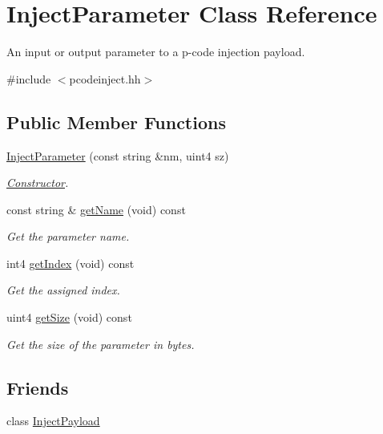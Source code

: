 \hypertarget{class_inject_parameter}{}\section{Inject\+Parameter Class Reference}
\label{class_inject_parameter}


An input or output parameter to a p-\/code injection payload.  




{\ttfamily \#include $<$pcodeinject.\+hh$>$}

\subsection*{Public Member Functions}
\begin{DoxyCompactItemize}
\item 
\mbox{\hyperlink{class_inject_parameter_a91de84dd9eafd1de37dfc56c7f526d8f}{Inject\+Parameter}} (const string \&nm, uint4 sz)
\begin{DoxyCompactList}\small\item\em \mbox{\hyperlink{class_constructor}{Constructor}}. \end{DoxyCompactList}\item 
const string \& \mbox{\hyperlink{class_inject_parameter_ae832644b1c2569f8bc0e65bc9927a23c}{get\+Name}} (void) const
\begin{DoxyCompactList}\small\item\em Get the parameter name. \end{DoxyCompactList}\item 
int4 \mbox{\hyperlink{class_inject_parameter_a8bf408340c63bc2d301f44edf7cfa881}{get\+Index}} (void) const
\begin{DoxyCompactList}\small\item\em Get the assigned index. \end{DoxyCompactList}\item 
uint4 \mbox{\hyperlink{class_inject_parameter_a0b0bd7385977774d8069fe3320c4a1b5}{get\+Size}} (void) const
\begin{DoxyCompactList}\small\item\em Get the size of the parameter in bytes. \end{DoxyCompactList}\end{DoxyCompactItemize}
\subsection*{Friends}
\begin{DoxyCompactItemize}
\item 
class \mbox{\hyperlink{class_inject_parameter_a9753ac525fa8dede3f71c665c8985741}{Inject\+Payload}}
\end{DoxyCompactItemize}


